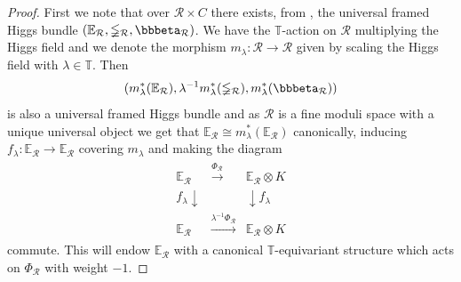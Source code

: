 \documentclass[12pt]{article}
\numberwithin{equation}{section}
\theoremstyle{remark}
\theoremstyle{definition}
\numberwithin{theorem}{section}
\def\beq{\begin{eqnarray}}
\def\eeq{\end{eqnarray}}
\def\bE{{\mathbb{E}}}
\def\bPhi{{\mathbb{\Phi}}}
\newcommand{\T}{{\mathbb{T}}}
\newcommand{\calR}{\mathcal{R}}
\renewcommand{\1}{\mathbbm{1}}
\begin{document}
\begin{proof}
	First we note that over $\calR\times C$ there exists, from \cite[Theorem 4.10]{simpson1}, the universal  framed Higgs bundle $(\bE_\calR,\bPhi_\calR,{\bbbeta}_\calR)$. We have the $\T$-action on $\calR$ multiplying the Higgs field and we  denote  the morphism $m_\lambda:\calR\to \calR$ given by scaling the Higgs field with $\lambda\in \T$. Then $$(m_\lambda^*(\bE_\calR),\lambda^{-1}m_\lambda^*(\bPhi_\calR),m_\lambda^*(\bbbeta_\calR))$$ is also a universal framed Higgs bundle and as $\calR$ is a fine moduli space with a unique universal object we get that $\bE_\calR\cong m_\lambda^*(\bE_\calR)$ canonically, inducing $f_\lambda:\bE_\calR\to \bE_\calR$ covering $m_\lambda$ and making the diagram \beq\label{univdiag}\begin{array}{ccc} \bE_\calR & \stackrel{\bPhi_\calR}{\longrightarrow} &\bE_\calR\otimes K \\ f_\lambda \downarrow && \downarrow f_\lambda  \\ \bE_\calR & \stackrel{\lambda^{-1} \bPhi_\calR}{\longrightarrow} &\bE_\calR\otimes K \end{array}\eeq commute. This will endow $\bE_\calR$ with a canonical $\T$-equivariant structure which acts on $\bPhi_\calR$ with weight $-1$.
	

\end{proof}
\end{document}
